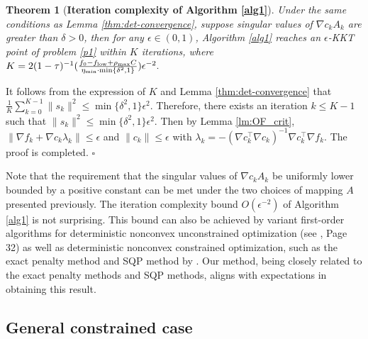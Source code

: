 \documentclass[11pt]{article}
\newtheorem{theorem}{Theorem}
\newenvironment{proof}{{\noindent\it Proof.}\quad}{\hfill $\square$\par}
\begin{document}
\begin{theorem}[{\bf Iteration complexity of Algorithm \ref{alg1}}]\label{cor:det-complexity}
    Under the same conditions as Lemma \ref{thm:det-convergence}, suppose   singular values of \(\nabla c_k A_k\) are greater than \(\delta > 0\), then for any \(\epsilon \in (0,1)\), Algorithm \ref{alg1} reaches an \(\epsilon\)-KKT point  of problem \eqref{p1} within $K$ iterations, where 
    $K=
    2(1-\tau)^{-1}(\frac{f_0-f_{\rm low}+\rho_{\rm max}C}{\eta_{\rm min}\cdot \min\left\{\delta^2,1\right\}})\epsilon^{-2}.
    $
\end{theorem}

\begin{proof}
    It follows from the expression of $K$ and Lemma \ref{thm:det-convergence} that \(\frac{1}{K}\sum_{k=0}^{K-1} \|s_k\|^2 \leq \min\{\delta^2,1\} \epsilon^2\). Therefore, there exists an iteration \(k \leq K-1\) such that \(\|s_k\|^2 \leq \min\{\delta^2,1\} \epsilon^2\). Then by Lemma \ref{lm:OF_crit},  $
    \|\nabla f_k + \nabla c_k \lambda_k\| \leq \epsilon $ and $ \|c_k\| \leq \epsilon 
    $ with \(\lambda_k = - (\nabla c_k^{\top} \nabla c_k)^{-1} \nabla c_k^{\top} \nabla f_k\). The proof is completed. 
\end{proof}

Note that the requirement that the singular values of $\nabla c_kA_k$ be  uniformly lower bounded by a positive  constant can be met under the two choices of mapping $A$ presented previously. The iteration complexity bound  $O(\epsilon^{-2})$ of Algorithm \ref{alg1} is not surprising. This bound can also be achieved by variant first-order algorithms for  deterministic nonconvex unconstrained optimization (see \cite{nesterov2018lectures}, Page 32) as well as deterministic nonconvex constrained optimization, such as the exact penalty method  \cite{cartis2017corrigendum}  and  SQP method by \cite{curtis2024worst}. Our method, being closely related to the exact penalty methods and SQP methods, aligns with expectations in obtaining this result.

\subsection{General constrained  case}\label{sec:full-det-method}
\end{document}
